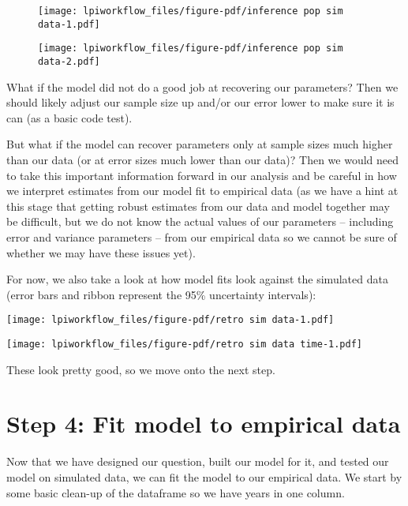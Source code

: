 \documentclass[
  letterpaper,
  DIV=11,
  numbers=noendperiod]{scrartcl}
\begin{document}
\begin{figure}

\begin{minipage}{0.50\linewidth}
\texttt{[image: lpiworkflow\_files/figure-pdf/inference pop sim data-1.pdf]}\end{minipage}%
%
\begin{minipage}{0.50\linewidth}
\texttt{[image: lpiworkflow\_files/figure-pdf/inference pop sim data-2.pdf]}\end{minipage}%

\end{figure}%

What if the model did not do a good job at recovering our parameters?
Then we should likely adjust our sample size up and/or our error lower
to make sure it is can (as a basic code test).

But what if the model can recover parameters only at sample sizes much
higher than our data (or at error sizes much lower than our data)? Then
we would need to take this important information forward in our analysis
and be careful in how we interpret estimates from our model fit to
empirical data (as we have a hint at this stage that getting robust
estimates from our data and model together may be difficult, but we do
not know the actual values of our parameters -- including error and
variance parameters -- from our empirical data so we cannot be sure of
whether we may have these issues yet).

For now, we also take a look at how model fits look against the
simulated data (error bars and ribbon represent the 95\% uncertainty
intervals):

\texttt{[image: lpiworkflow\_files/figure-pdf/retro sim data-1.pdf]}

\texttt{[image: lpiworkflow\_files/figure-pdf/retro sim data time-1.pdf]}

These look pretty good, so we move onto the next step.

\section{Step 4: Fit model to empirical
data}\label{step-4-fit-model-to-empirical-data}

Now that we have designed our question, built our model for it, and
tested our model on simulated data, we can fit the model to our
empirical data. We start by some basic clean-up of the dataframe so we
have years in one column.
\end{document}
